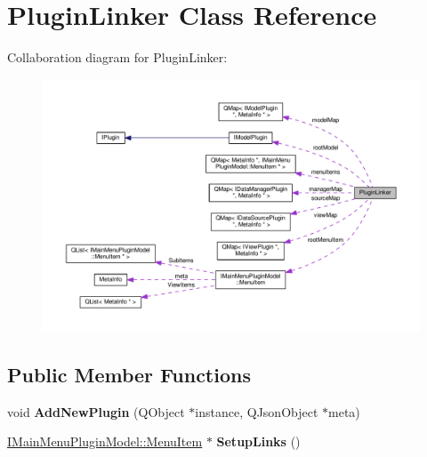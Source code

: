 \hypertarget{class_plugin_linker}{}\section{Plugin\+Linker Class Reference}
\label{class_plugin_linker}


Collaboration diagram for Plugin\+Linker\+:\nopagebreak
\begin{figure}[H]
\begin{center}
\leavevmode
\includegraphics[width=350pt]{class_plugin_linker__coll__graph}
\end{center}
\end{figure}
\subsection*{Public Member Functions}
\begin{DoxyCompactItemize}
\item 
void {\bfseries Add\+New\+Plugin} (Q\+Object $\ast$instance, Q\+Json\+Object $\ast$meta)\hypertarget{class_plugin_linker_a864d8fa78e948711e62a3985f57e2315}{}\label{class_plugin_linker_a864d8fa78e948711e62a3985f57e2315}

\item 
\hyperlink{struct_i_main_menu_plugin_model_1_1_menu_item}{I\+Main\+Menu\+Plugin\+Model\+::\+Menu\+Item} $\ast$ {\bfseries Setup\+Links} ()\hypertarget{class_plugin_linker_ad47aca648a1bd5dfd75d0829f7bacc16}{}\label{class_plugin_linker_ad47aca648a1bd5dfd75d0829f7bacc16}

\end{DoxyCompactItemize}
